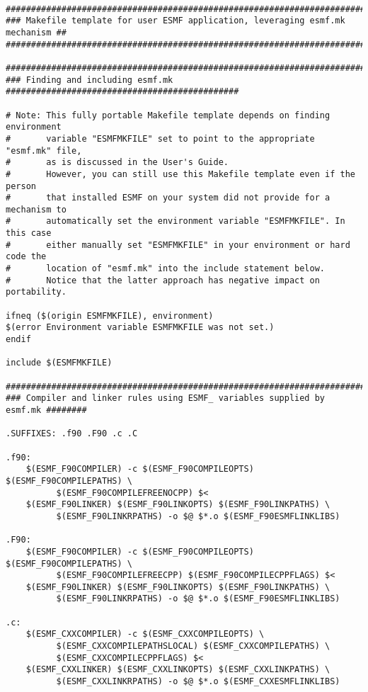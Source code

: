 \begin{verbatim}

################################################################################
### Makefile template for user ESMF application, leveraging esmf.mk mechanism ##
################################################################################

################################################################################
### Finding and including esmf.mk ##############################################

# Note: This fully portable Makefile template depends on finding environment
#       variable "ESMFMKFILE" set to point to the appropriate "esmf.mk" file,
#       as is discussed in the User's Guide.
#       However, you can still use this Makefile template even if the person
#       that installed ESMF on your system did not provide for a mechanism to
#       automatically set the environment variable "ESMFMKFILE". In this case
#       either manually set "ESMFMKFILE" in your environment or hard code the
#       location of "esmf.mk" into the include statement below.
#       Notice that the latter approach has negative impact on portability.

ifneq ($(origin ESMFMKFILE), environment)
$(error Environment variable ESMFMKFILE was not set.)
endif

include $(ESMFMKFILE)

################################################################################
### Compiler and linker rules using ESMF_ variables supplied by esmf.mk ########

.SUFFIXES: .f90 .F90 .c .C

.f90:
	$(ESMF_F90COMPILER) -c $(ESMF_F90COMPILEOPTS) $(ESMF_F90COMPILEPATHS) \
          $(ESMF_F90COMPILEFREENOCPP) $<
	$(ESMF_F90LINKER) $(ESMF_F90LINKOPTS) $(ESMF_F90LINKPATHS) \
          $(ESMF_F90LINKRPATHS) -o $@ $*.o $(ESMF_F90ESMFLINKLIBS)        

.F90:
	$(ESMF_F90COMPILER) -c $(ESMF_F90COMPILEOPTS) $(ESMF_F90COMPILEPATHS) \
          $(ESMF_F90COMPILEFREECPP) $(ESMF_F90COMPILECPPFLAGS) $<
	$(ESMF_F90LINKER) $(ESMF_F90LINKOPTS) $(ESMF_F90LINKPATHS) \
          $(ESMF_F90LINKRPATHS) -o $@ $*.o $(ESMF_F90ESMFLINKLIBS)        
        
.c:
	$(ESMF_CXXCOMPILER) -c $(ESMF_CXXCOMPILEOPTS) \
          $(ESMF_CXXCOMPILEPATHSLOCAL) $(ESMF_CXXCOMPILEPATHS) \
          $(ESMF_CXXCOMPILECPPFLAGS) $<
	$(ESMF_CXXLINKER) $(ESMF_CXXLINKOPTS) $(ESMF_CXXLINKPATHS) \
          $(ESMF_CXXLINKRPATHS) -o $@ $*.o $(ESMF_CXXESMFLINKLIBS)


\end{verbatim}
